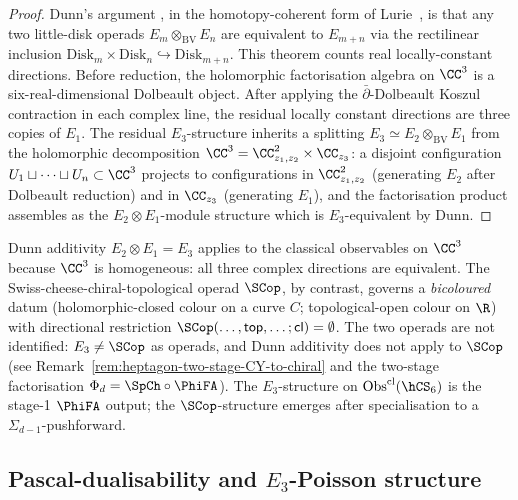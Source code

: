 \begin{proof}
Dunn's argument \cite{Dunn88}, in the homotopy-coherent form of
Lurie~\cite[\S 5.1.2]{HA}, is that any two little-disk operads
$E_m\otimes_{\mathrm{BV}} E_n$ are equivalent to $E_{m+n}$ via the
rectilinear inclusion $\mathrm{Disk}_m\times \mathrm{Disk}_n
\hookrightarrow \mathrm{Disk}_{m+n}$. This theorem counts real
locally-constant directions.  Before reduction, the holomorphic
factorisation algebra on \(\CC^3\) is a six-real-dimensional
Dolbeault object.  After applying the \(\bar\partial\)-Dolbeault
Koszul contraction in each complex line, the residual locally constant
directions are three copies of \(E_1\). The residual $E_3$-structure
inherits a splitting $E_3\simeq E_2\otimes_{\mathrm{BV}} E_1$ from
the holomorphic decomposition $\CC^3 = \CC^2_{z_1,z_2}\times\CC_{z_3}$:
a disjoint configuration $U_1\sqcup\cdots\sqcup U_n \subset \CC^3$
projects to configurations in $\CC^2_{z_1,z_2}$ (generating $E_2$
after Dolbeault reduction) and in $\CC_{z_3}$ (generating $E_1$),
and the factorisation product assembles as the $E_2\otimes E_1$-module
structure which is $E_3$-equivalent by Dunn.
\end{proof}

\begin{remark}
\label{rem:sc-not-dunn}
Dunn additivity $E_2\otimes E_1 = E_3$ applies to the classical
observables on $\CC^3$ because $\CC^3$ is homogeneous: all three
complex directions are equivalent. The Swiss-cheese-chiral-topological
operad $\SCop$, by contrast, governs a \emph{bicoloured} datum
(holomorphic-closed colour on a curve $C$; topological-open colour on
$\R$) with directional restriction
$\SCop(\ldots,\mathsf{top},\ldots;\mathsf{cl}) = \emptyset$. The two
operads are not identified: $E_3 \neq \SCop$ as
operads, and Dunn additivity does not apply to $\SCop$
(see Remark~\ref{rem:heptagon-two-stage-CY-to-chiral} and the
two-stage factorisation $\Phi_d = \SpCh \circ \PhiFA$). The
$E_3$-structure on $\mathrm{Obs}^{\mathrm{cl}}(\hCS_6)$ is the
stage-1 $\PhiFA$ output; the $\SCop$-structure emerges after
specialisation to a $\Sigma_{d-1}$-pushforward.
\end{remark}

\subsection{Pascal-dualisability and $E_3$-Poisson structure}
\label{subsec:E3-pascal}

